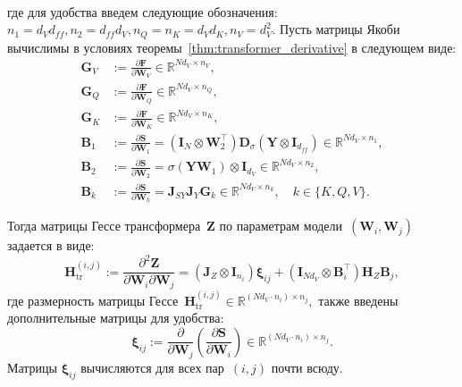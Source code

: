 \begin{theorem}
\begin{align}
\end{align}
где для удобства введем следующие обозначения:~ $n_1 = d_V d_{ff}, n_2 = d_{ff} d_V, n_Q = n_K = d_V d_K, n_V = d_V^2.$
Пусть матрицы Якоби вычислимы в условиях теоремы~\ref{thm:transformer_derivative} в следующем виде:
\begin{align}
     \mathbf{G}_V &:= \frac{\partial \mathbf{F}}{\partial \mathbf{W}_V} \in \mathbb{R}^{N d_V \times n_V},\\
     \mathbf{G}_Q &:= \frac{\partial \mathbf{F}}{\partial \mathbf{W}_Q} \in \mathbb{R}^{N d_V \times n_Q},\\
     \mathbf{G}_K &:= \frac{\partial \mathbf{F}}{\partial \mathbf{W}_K} \in \mathbb{R}^{N d_V \times n_K},\\
     \mathbf{B}_1 &:= \frac{\partial \mathbf{S}}{\partial \mathbf{W}_1} = (\mathbf{I}_{N} \otimes \mathbf{W}_2^\top) \mathbf{D}_\sigma (\mathbf{Y} \otimes \mathbf{I}_{d_{ff}}) \in \mathbb{R}^{N d_V \times n_1},\\
     \mathbf{B}_2 &:= \frac{\partial \mathbf{S}}{\partial \mathbf{W}_2} = \sigma(\mathbf{Y}\mathbf{W}_1) \otimes \mathbf{I}_{d_V} \in \mathbb{R}^{N d_V \times n_2},\\
     \mathbf{B}_k &:= \frac{\partial \mathbf{S}}{\partial \mathbf{W}_k} = \mathbf{J}_{SY} \mathbf{J}_Y \mathbf{G}_k \in \mathbb{R}^{N d_V \times n_k}, \quad k \in \{K,Q,V\}.
\end{align}

Тогда матрицы Гессе трансформера~$\mathbf{Z}$ по параметрам модели~$(\mathbf{W}_i,\mathbf{W}_j)$ задается в виде:
\begin{equation}\label{eq:block_hessian_transformer}
    \mathbf{H}_{\mathrm{tr}}^{(i,j)} := \frac{\partial^2 \mathbf{Z}}{\partial \mathbf{W}_i \partial \mathbf{W}_j}
    = \left( \mathbf{J}_Z \otimes \mathbf{I}_{n_i} \right) \boldsymbol{\xi}_{ij}
      + \left( \mathbf{I}_{N d_V} \otimes \mathbf{B}_i^\top \right) \mathbf{H}_Z \mathbf{B}_j,
\end{equation}
где размерность матрицы Гессе~$\mathbf{H}_{\mathrm{tr}}^{(i,j)} \in \mathbb{R}^{(N d_V \cdot n_i) \times n_j},$ также введены дополнительные матрицы для удобства:
\[
    \boldsymbol{\xi}_{ij} := \frac{\partial}{\partial \mathbf{W}_j} \left( \frac{\partial \mathbf{S}}{\partial \mathbf{W}_i} \right) \in \mathbb{R}^{(N d_V \cdot n_i) \times n_j}.
\]
Матрицы $\boldsymbol{\xi}_{ij}$ вычисляются для всех пар~$(i,j)$ почти всюду.


\end{theorem}
